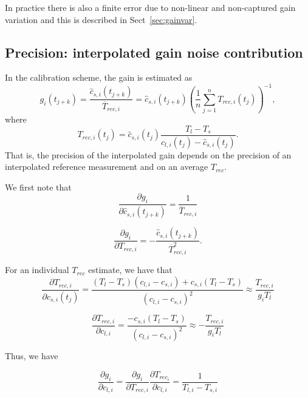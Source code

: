 In practice there is also a finite error due to non-linear and non-captured
gain variation and this is described in Sect~\ref{sec:gainvar}.

   
\subsection*{Precision: interpolated gain noise contribution}

In the calibration scheme, the gain is estimated as
\begin{equation}
g_{i}(t_{j+k}) = \frac{\hat{c}_{s,i}(t_{j+k})}{\overline{T}_{rec,i}} = \hat{c}_{s,i}(t_{j+k})\left(\frac{1}{n}\sum_{j=1}^{n}T_{rec,i}(t_{j})\right)^{-1}, 
\end{equation}
where
\begin{equation}
T_{rec,i}(t_{j}) = \hat{c}_{s,i}(t_{j}) \frac{ T_{l} - T_{s} }{  c_{l,i}(t_{j})- \hat{c}_{s,i}(t_{j})  }.
\end{equation}
That is, the precision of the interpolated gain depends on the precision of an interpolated
reference measurement and on an average \(T_{rec}\). 

We first note that
\begin{equation}
\frac{\partial g_{i}}{\partial \hat{c}_{s,i}(t_{j+k})} = \frac{1}{\overline{T}_{rec,i}}
\end{equation}

\begin{equation}
\frac{\partial g_{i}}{\partial T_{rec,i}} = - \frac{\hat{c}_{s,i}(t_{j+k})}{\overline{T}_{rec,i}^2}.
\end{equation}

For an individual \(T_{rec}\) estimate, we have that
\begin{equation}
 \frac{\partial T_{rec,i}}{\partial c_{s,i}(t_{j})} = \frac{(T_{l}-T_{s})(c_{l,i}-c_{s,i}) + c_{s,i}(T_{l}-T_{s})}
{(c_{l,i}-c_{s,i})^2} \approx \frac{T_{rec,i}}{g_{i}T_{l}}
\end{equation}

\begin{equation}
 \frac{\partial T_{rec,i}}{\partial c_{l,i}} = \frac{-c_{s,i}(T_{l}-T_{s})}{(c_{l,i}-c_{s,i})^2} \approx -\frac{T_{rec,i}}{g_{i}T_{l}}
\end{equation}

Thus, we have

\begin{equation}
 \frac{\partial g_{i}}{\partial c_{l,i}} = \frac{\partial g_{i}}{\partial T_{rec,i}}\frac{\partial T_{rec_{i}}}{\partial c_{l,i}}=
\frac{1}{T_{l,i}-T_{s,i}} 
\end{equation}

